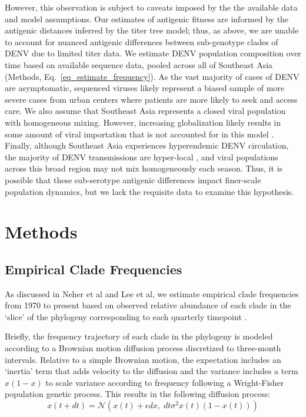 However, this observation is subject to caveats imposed by the the available data and model assumptions.
Our estimates of antigenic fitness are informed by the antigenic distances inferred by the titer tree model; thus, as above, we are unable to account for nuanced antigenic differences between sub-genotype clades of DENV due to limited titer data.
We estimate DENV population composition over time based on available sequence data, pooled across all of Southeast Asia (Methods, Eq.~\ref{eq_estimate_frequency}).
As the vast majority of cases of DENV are asymptomatic, sequenced viruses likely represent a biased sample of more severe cases from urban centers where patients are more likely to seek and access care.
We also assume that Southeast Asia represents a closed viral population with homogeneous mixing.
However, increasing globalization likely results in some amount of viral importation that is not accounted for in this model \citep{allicock2012phylogeography}.
Finally, although Southeast Asia experiences hyperendemic DENV circulation, the majority of DENV transmissions are hyper-local \citep{salje2017dengue}, and viral populations across this broad region may not mix homogeneously each season.
Thus, it is possible that these sub-serotype antigenic differences impact finer-scale population dynamics, but we lack the requisite data to examine this hypothesis.

\section{Methods}
\subsection*{Empirical Clade Frequencies}
As discussed in Neher et al and Lee et al, we estimate empirical clade frequencies from 1970 to present based on observed relative abundance of each clade in the `slice' of the phylogeny corresponding to each quarterly timepoint \citep{lee2018deep,neher2016prediction}.

Briefly, the frequency trajectory of each clade in the phylogeny is modeled according to a Brownian motion diffusion process discretized to three-month intervals.
Relative to a simple Brownian motion, the expectation includes an `inertia' term that adds velocity to the diffusion and the variance includes a term $x(1-x)$ to scale variance according to frequency following a Wright-Fisher population genetic process.
This results in the following diffusion process:
\begin{equation}
  \label{eq_estimate_frequency}
x(t+dt) = \mathcal{N}\left(x(t) + \epsilon dx, \; dt \sigma^2 x(t) (1-x(t))\right)
\end{equation}

